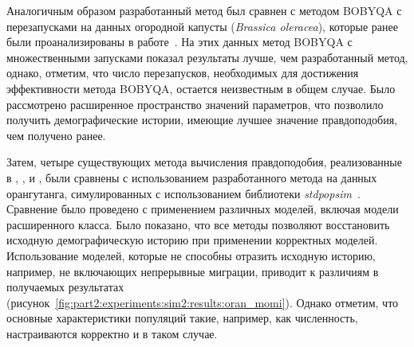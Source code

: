 \begin{table}[ht]
    \centering
    \caption{Результаты 100 запусков различных методов для поиска параметров модели с инбридингом для вывода демографической истории двух популяций пум}
\end{table}

Аналогичным образом разработанный метод был сравнен с методом BOBYQA с перезапусками на данных огородной капусты (\textit{Brassica oleracea}), которые ранее были   проанализированы в работе~\cite{blischak2020inferring}.
На этих данных метод BOBYQA с множественными запусками показал результаты лучше, чем разработанный метод, однако, отметим, что число перезапусков, необходимых для достижения эффективности метода BOBYQA, остается неизвестным в общем случае.
Было рассмотрено расширенное пространство значений параметров, что позволило получить демографические истории, имеющие лучшее значение правдоподобия, чем получено ранее.

Затем, четыре существующих метода вычисления правдоподобия, реализованные в \dadi, \moments, \momi и \momentsLD, были сравнены с использованием разработанного метода на данных орангутанга, симулированных с использованием библиотеки \textit{stdpopsim}~\cite{adrion2020community,lauterbur2023expanding}.
Сравнение было проведено с применением различных моделей, включая модели расширенного класса.
Было показано, что все методы позволяют восстановить исходную демографическую историю при применении корректных моделей.
Использование моделей, которые не способны отразить исходную историю, например, не включающих непрерывные миграции, приводит к различиям в получаемых результатах (рисунок~\ref{fig:part2:experiments:sim2:results:oran_momi}).
Однако отметим, что основные характеристики популяций такие, например, как численность, настраиваются корректно и в таком случае.

